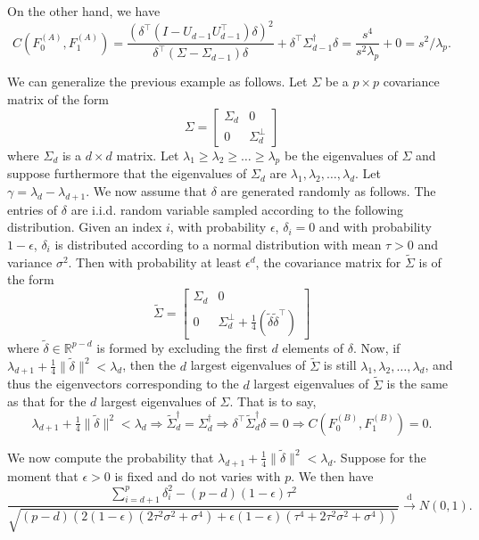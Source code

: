 \documentclass[10pt]{article}
\begin{document}
On the other hand, we have
$$ C(F_0^{(A)}, F_1^{(A)}) = \frac{(\delta^{\top} (I - U_{d-1} U_{d-1}^{\top}) \delta)^{2}}{\delta^{\top} (\Sigma - \Sigma_{d-1}) \delta} + \delta^{\top} \Sigma_{d-1}^{\dagger} \delta = \frac{s^4}{s^2 \lambda_p} + 0 = s^{2}/\lambda_p.$$


We can generalize the previous example as follows. Let $\Sigma$ be a $p \times p$ covariance matrix of the form
$$ \Sigma = \begin{bmatrix} \Sigma_{d} & 0 \\ 0 & \Sigma_{d}^{\perp} \end{bmatrix} $$ where $\Sigma_{d}$ is a $d \times d$ matrix.
Let $\lambda_1 \geq \lambda_2 \geq \dots \geq \lambda_p$ be the eigenvalues of $\Sigma$ and suppose furthermore that the eigenvalues of $\Sigma_{d}$ are $\lambda_1, \lambda_2, \dots, \lambda_d$. Let $\gamma = \lambda_{d} - \lambda_{d+1}$.
We now assume that $\delta$ are generated randomly as follows. The entries of $\delta$ are i.i.d. random variable sampled according to the following distribution. Given an index $i$, with probability $\epsilon$, $\delta_i = 0$ and with probability $1 - \epsilon$, $\delta_i$ is distributed according to a normal distribution with mean $\tau > 0$ and variance $\sigma^2$. Then with probability at least $\epsilon^{d}$, the covariance matrix for $\tilde{\Sigma}$ is of the form
$$ \tilde{\Sigma} = \begin{bmatrix} \Sigma_{d} & 0 \\ 0 & \Sigma_{d}^{\perp} + \tfrac{1}{4} (\tilde{\delta} \tilde{\delta}^{\top}) \end{bmatrix} $$
where $\tilde{\delta} \in \mathbb{R}^{p - d}$ is formed by excluding the first $d$ elements of $\delta$.
Now, if $\lambda_{d+1} + \tfrac{1}{4} \|\tilde{\delta}\|^{2} < \lambda_d$, then
the $d$ largest eigenvalues of $\tilde{\Sigma}$ is still $\lambda_1, \lambda_2, \dots, \lambda_d$, and thus the eigenvectors corresponding to the $d$ largest eigenvalues of $\tilde{\Sigma}$ is the same as that for the $d$ largest eigenvalues of $\Sigma$. That is to say, $$ \lambda_{d+1} + \tfrac{1}{4} \|\tilde{\delta}\|^{2} < \lambda_d \Longrightarrow \tilde{\Sigma}_{d}^{\dagger} = \Sigma_{d}^{\dagger} \Longrightarrow \delta^{\top} \tilde{\Sigma}_{d}^{\dagger} \delta = 0 \Longrightarrow C(F_0^{(B)}, F_1^{(B)}) = 0.$$

We now compute the probability that $\lambda_{d+1} + \tfrac{1}{4} \|\tilde{\delta}\|^{2} < \lambda_d$. Suppose for the moment that $\epsilon > 0$ is fixed and do not varies with $p$. We then have
$$ \frac{\sum_{i=d+1}^{p} \delta_i^{2} - (p - d) (1 - \epsilon) \tau^2}{\sqrt{(p - d)(2 (1 - \epsilon) (2 \tau^2 \sigma^2 + \sigma^4) + \epsilon (1 - \epsilon) (\tau^4 + 2 \tau^2 \sigma^2 + \sigma^4))}} \overset{\mathrm{d}}{\longrightarrow} N(0,1).$$
\end{document}
